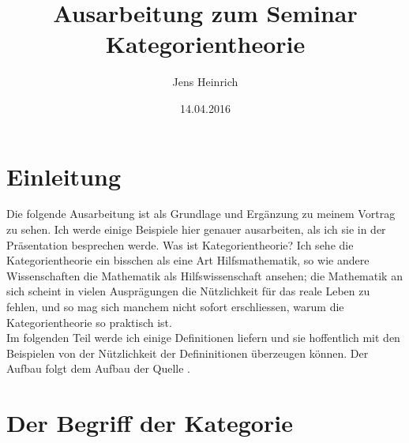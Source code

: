 \documentclass{article}
\title{Ausarbeitung zum Seminar Kategorientheorie}
\author{Jens Heinrich}
\date{14.04.2016}
\begin{document}
\maketitle
\section{Einleitung}
	Die folgende Ausarbeitung ist als Grundlage und Erg\"anzung zu meinem Vortrag zu sehen. 
	Ich werde einige Beispiele hier genauer ausarbeiten, als ich sie in der Pr\"asentation besprechen werde.
	Was ist Kategorientheorie? 
	Ich sehe die Kategorientheorie ein bisschen als eine Art Hilfsmathematik, so wie andere Wissenschaften die Mathematik als Hilfswissenschaft ansehen;
	die Mathematik an sich scheint in vielen Auspr\"agungen die N\"utzlichkeit f\"ur das reale Leben zu fehlen,
	und so mag sich manchem nicht sofort erschliessen, 
	warum die Kategorientheorie so praktisch ist.
	\\
	Im folgenden Teil werde ich einige Definitionen liefern und sie hoffentlich mit den Beispielen von der N\"utzlichkeit der Defininitionen \"uberzeugen k\"onnen. Der Aufbau folgt dem Aufbau der Quelle \nocite{Bra}.
	
\section{Der Begriff der Kategorie}
	
\end{document}

